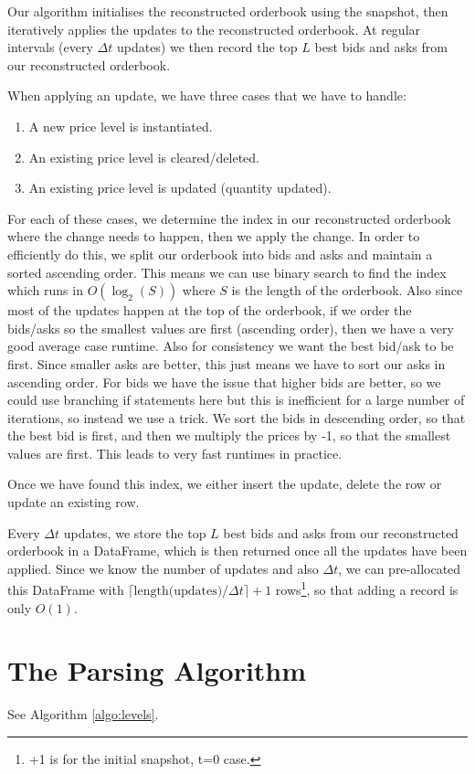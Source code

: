 Our algorithm initialises the reconstructed orderbook using the snapshot, then iteratively applies
the updates to the reconstructed orderbook. At regular intervals (every $\Delta t$ updates) we
then record the top $L$ best bids and asks from our reconstructed orderbook.

When applying an update, we have three cases that we have to handle:
\begin{enumerate}
    \item A new price level is instantiated.
    \item An existing price level is cleared/deleted.
    \item An existing price level is updated (quantity updated).
\end{enumerate}

For each of these cases, we determine the index in our reconstructed orderbook
where the change needs to happen, then we apply the change. In order to efficiently do this, we split our
orderbook into bids and asks and maintain a sorted ascending order.
This means we can use binary search to find the index which runs in $O(\log_2(S))$ 
where $S$ is the length of the orderbook. Also since most of the updates
happen at the top of the orderbook, if we order the bids/asks so the smallest values
are first (ascending order), then we have a very good average case runtime.
Also for consistency we want the best bid/ask to be first.
Since smaller asks are better, this just means we have to sort our asks in 
ascending order. For bids we have the issue that higher bids are better,
so we could use branching if statements here but this is inefficient for a large
number of iterations, so instead we use a trick. We sort the bids in descending order,
so that the best bid is first, and then we multiply the prices by -1, so that
the smallest values are first. This leads to very fast runtimes in practice.

Once we have found this index, we either insert the update, delete the row or
update an existing row.

Every $\Delta t$ updates, we store the top $L$ best bids and asks from our reconstructed
orderbook in a DataFrame, which is then returned once all the updates
have been applied. Since we know the number of updates and also $\Delta t$, we can
pre-allocated this DataFrame with $\lceil \text{length(updates)} / \Delta t \rceil + 1$ rows\footnote{+1 is for the initial snapshot, t=0 case.}, so that
adding a record is only $O(1)$. 

\section{The Parsing Algorithm}
See Algorithm \ref{algo:levels}.

